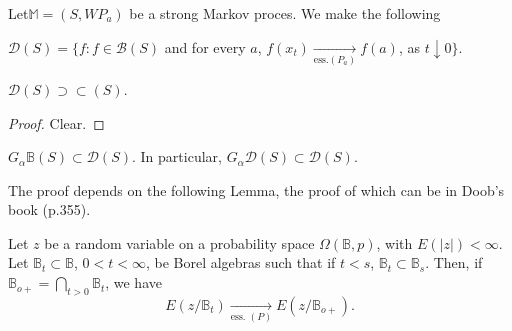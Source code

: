 Let\pageoriginale $\mathbb{M} = (S,W P_a)$ be a strong Markov
proces. We make the following  

\begin{defi*}
$\mathscr{D} (S) = \big\{ f : f \in \mathscr{B} (S)$ and for
  every $a$, $f (x_t) \xrightarrow[\text{ess.}(P_a)]{} f (a)$, as $t
  \downarrow 0 \big\}$. 
\end{defi*}

\setcounter{thm}{0}
\begin{thm}\label{chap2-sec9-thm1}%
  $\mathscr{D} (S) \supset \subset (S)$.
\end{thm}

\begin{proof}
 Clear.
\end{proof}

\begin{thm}\label{chap2-sec9-thm2}%
$G_\alpha \mathbb{B}(S) \subset \mathscr{D} (S)$. In particular,
  $G_\alpha \mathscr{D} (S) \subset \mathscr{D} (S)$. 
\end{thm}

The proof depends on the following Lemma, the proof of which can be in
Doob's book (p.355).

\begin{lemma*}
Let $z$ be a random variable on a probability space $\Omega
  (\mathbb{B}, p)$, with $E(|z|) < \infty$. Let $\mathbb{B}_t \subset
  \mathbb{B}$, $0 < t < \infty$, be Borel algebras such that if $t < s$,
  $\mathbb{B}_t \subset \mathbb{B}_s$. Then, if $\mathbb{B}_{o+} =
  \bigcap\limits_{t > 0} \mathbb{B}_t$, we have 
$$
E (z/\mathbb{B}_t) \xrightarrow[\text{ess. }(P)]{} E (z/ \mathbb{B}_{o+}).
$$
\end{lemma*}


